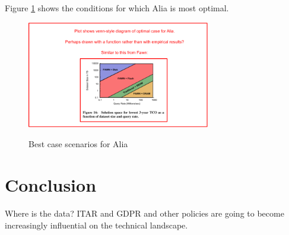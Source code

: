 \documentclass[sigplan,screen,review,anonymous,nonacm]{acmart}
\begin{document}
Figure \ref{fig:venn-diagram} shows the conditions for which Alia is most
optimal.

\begin{figure}
\caption{Best case scenarios for Alia}
\centering
\includegraphics[width=8cm]{venn-diagram-placeholder.png}
\label{fig:venn-diagram}
\end{figure}


\section{Conclusion}

Where is the data? ITAR and GDPR and other policies are going to become increasingly
influential on the technical landscape.




\end{document}
